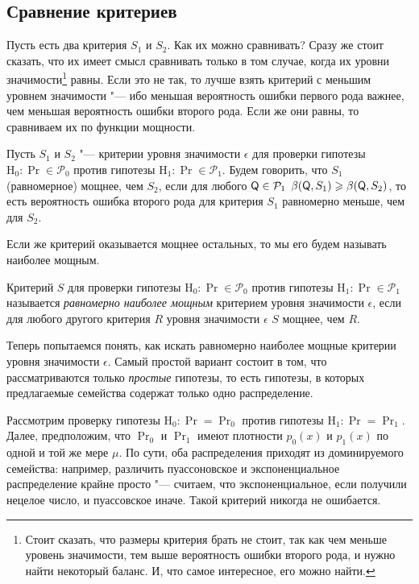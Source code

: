 \subsection{Сравнение критериев}
Пусть есть два критерия $S_{1}$ и $S_{2}$. Как их можно сравнивать? Сразу же стоит сказать, что их имеет смысл сравнивать только в том случае, когда их уровни значимости\footnote{Стоит сказать, что размеры критерия брать не стоит, так как чем меньше уровень значимости, тем выше вероятность ошибки второго рода, и нужно найти некоторый баланс. И, что самое интересное, его можно найти.} равны. Если это не так, то лучше взять критерий с меньшим уровнем значимости "--- ибо меньшая вероятность ошибки первого рода важнее, чем меньшая вероятность ошибки второго рода. Если же они равны, то сравниваем их по функции мощности.
\begin{definition}
	Пусть $S_{1}$ и $S_{2}$ "--- критерии уровня значимости $\epsilon$ для проверки гипотезы $\mathrm{H}_{0} \colon \Pr \in \mathcal{P}_{0}$ против гипотезы $\mathrm{H}_{1} \colon \Pr \in \mathcal{P}_{1}$. Будем говорить, что $S_{1}$ (равномерное) мощнее, чем $S_{2}$, если для любого $\mathsf{Q} \in \mathcal{P}_{1}$ $\beta(\mathsf{Q}, S_{1}) \geqslant \beta(\mathsf{Q}, S_{2})$, то есть вероятность ошибка второго рода для критерия $S_{1}$ равномерно меньше, чем для $S_{2}$.
\end{definition}
Если же критерий оказывается мощнее остальных, то мы его будем называть наиболее мощным.
\begin{definition}
	Критерий $S$ для проверки гипотезы $\mathrm{H}_{0} \colon \Pr \in \mathcal{P}_{0}$ против гипотезы $\mathrm{H}_{1} \colon \Pr \in \mathcal{P}_{1}$ называется \emph{равномерно наиболее мощным} критерием уровня значимости $\epsilon$, если для любого другого критерия $R$ уровня значимости $\epsilon$ $S$ мощнее, чем $R$.
\end{definition}

Теперь попытаемся понять, как искать равномерно наиболее мощные критерии уровня значимости $\epsilon$. Самый простой вариант состоит в том, что рассматриваются только \emph{простые} гипотезы, то есть гипотезы, в которых предлагаемые семейства содержат только одно распределение.

Рассмотрим проверку гипотезы $\mathrm{H}_{0} \colon \Pr = \Pr_{0}$ против гипотезы $\mathrm{H}_{1} \colon \Pr = \Pr_{1}$. Далее, предположим, что $\Pr_{0}$ и $\Pr_{1}$ имеют плотности $p_{0}(x)$ и $p_{1}(x)$ по одной и той же мере $\mu$. По сути, оба распределения приходят из доминируемого семейства: например, различить пуассоновское и экспоненциальное распределение крайне просто "--- считаем, что экспоненциальное, если получили нецелое число, и пуассовское иначе. Такой критерий никогда не ошибается.

